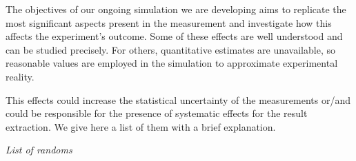 \documentclass[11pt,a4paper,oneside]{article}
\begin{document}
The objectives of our ongoing simulation we are developing aims to replicate the most significant aspects present in the measurement and investigate how this affects the experiment's outcome. Some of these effects are well understood and can be studied precisely. For others, quantitative estimates are unavailable, so reasonable values are employed in the simulation to approximate experimental reality.

This effects could increase the statistical uncertainty of the measurements or/and could be responsible for the presence of systematic effects for the result extraction. We give here a list of them with a brief explanation.

\begin{center}
\textit{List of randoms}
\end{center}
\end{document}
